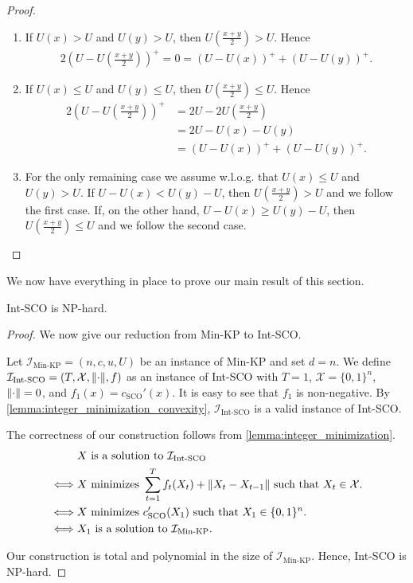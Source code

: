 \begin{proof}
\begin{enumerate}
    \item If $U(x) > U$ and $U(y) > U$, then $U\left(\frac{x+y}{2}\right) > U$. Hence \begin{align*}
        2\left(U - U\left(\frac{x+y}{2}\right)\right)^+ = 0 = (U - U(x))^+ + (U - U(y))^+.
    \end{align*}
    \item If $U(x) \leq U$ and $U(y) \leq U$, then $U\left(\frac{x+y}{2}\right) \leq U$. Hence \begin{align*}
        2\left(U - U\left(\frac{x+y}{2}\right)\right)^+ &= 2U - 2U\left(\frac{x+y}{2}\right) \\
                                                        &= 2U - U(x) - U(y) \\
                                                        &= (U - U(x))^+ + (U - U(y))^+.
    \end{align*}
    \item For the only remaining case we assume w.l.o.g. that $U(x) \leq U$ and $U(y) > U$. If $U - U(x) < U(y) - U$, then $U\left(\frac{x+y}{2}\right) > U$ and we follow the first case. If, on the other hand, $U - U(x) \geq U(y) - U$, then $U\left(\frac{x+y}{2}\right) \leq U$ and we follow the second case.\qedhere
\end{enumerate}
\end{proof}

We now have everything in place to prove our main result of this section.

\begin{theorem}
Int-SCO is NP-hard.
\end{theorem}
\begin{proof}
We now give our reduction from Min-KP to Int-SCO.

Let $\mathcal{I}_{\text{Min-KP}} = (n, c, u, U)$ be an instance of Min-KP and set $d = n$. We define $\mathcal{I}_{\text{Int-SCO}} = (T, \mathcal{X}, \lVert\cdot\rVert, f)$ as an instance of Int-SCO with $T = 1$, $\mathcal{X} = \{0,1\}^n$, $\lVert\cdot\rVert = 0$, and $f_1(x) = c_{\text{SCO}}'(x)$. It is easy to see that $f_1$ is non-negative. By \autoref{lemma:integer_minimization_convexity}, $\mathcal{I}_{\text{Int-SCO}}$ is a valid instance of Int-SCO.

The correctness of our construction follows from \autoref{lemma:integer_minimization}. \begin{align*}
         &X \text{ is a solution to } \mathcal{I}_{\text{Int-SCO}} \\
    \iff &X \text{ minimizes } \sum_{t=1}^T f_t(X_t) + \lVert X_t - X_{t-1}\rVert \text{ such that } X_t \in \mathcal{X}. \\
    \iff &X \text{ minimizes } c_{\text{SCO}}'(X_1) \text{ such that } X_1 \in \{0,1\}^n. \\
    \iff &X_1 \text{ is a solution to } \mathcal{I}_{\text{Min-KP}}.
\end{align*}

Our construction is total and polynomial in the size of $\mathcal{I}_{\text{Min-KP}}$. Hence, Int-SCO is NP-hard.
\end{proof}

